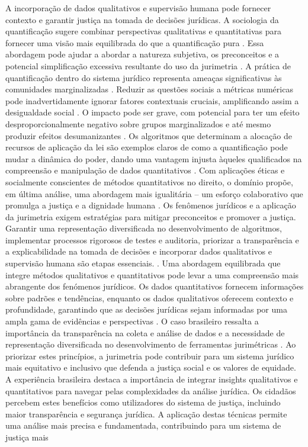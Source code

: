 A incorporação de dados qualitativos e supervisão humana pode fornecer contexto e garantir justiça na tomada de decisões jurídicas. A sociologia da quantificação sugere combinar perspectivas qualitativas e quantitativas para fornecer uma visão mais equilibrada do que a quantificação pura \cite{10.1057/s41599-020-00557-0,10.5040/9781350220645}. Essa abordagem pode ajudar a abordar a natureza subjetiva, os preconceitos e a potencial simplificação excessiva resultante do uso da jurimetria \cite{10.1057/s41599-020-00557-0,10.5040/9781350220645}. A prática de quantificação dentro do sistema jurídico representa ameaças significativas às comunidades marginalizadas \cite{10.1057/s41599-020-00557-0,10.1057/s41599-020-0396-5}. Reduzir as questões sociais a métricas numéricas pode inadvertidamente ignorar fatores contextuais cruciais, amplificando assim a desigualdade social \cite{10.1057/s41599-020-00557-0,10.1057/s41599-020-0396-5}. O impacto pode ser grave, com potencial para ter um efeito desproporcionalmente negativo sobre grupos marginalizados e até mesmo produzir efeitos desumanizantes \cite{10.1057/s41599-020-0396-5,10.1057/s41599-020-00557-0}. Os algoritmos que determinam a alocação de recursos de aplicação da lei são exemplos claros de como a quantificação pode mudar a dinâmica do poder, dando uma vantagem injusta àqueles qualificados na compreensão e manipulação de dados quantitativos \cite{10.1590/dados.2022.65.3.267,1023071190721}. Com aplicações éticas e socialmente conscientes de métodos quantitativos no direito, o domínio propõe, em última análise, uma abordagem mais igualitária – um esforço colaborativo que promulga a justiça e a dignidade humana \cite{10.1007/s11186-021}. Os fenômenos jurídicos e a aplicação da jurimetria exigem estratégias para mitigar preconceitos e promover a justiça. Garantir uma representação diversificada no desenvolvimento de algoritmos, implementar processos rigorosos de testes e auditoria, priorizar a transparência e a explicabilidade na tomada de decisões e incorporar dados qualitativos e supervisão humana são etapas essenciais. . Uma abordagem equilibrada que integre métodos qualitativos e quantitativos pode levar a uma compreensão mais abrangente dos fenómenos jurídicos. Os dados quantitativos fornecem informações sobre padrões e tendências, enquanto os dados qualitativos oferecem contexto e profundidade, garantindo que as decisões jurídicas sejam informadas por uma ampla gama de evidências e perspectivas \cite{unger2021process}. O caso brasileiro ressalta a importância da transparência na coleta e análise de dados e a necessidade de representação diversificada no desenvolvimento de ferramentas jurimétricas \cite{10.1590/dados.2022.65.3.267,10.1007/978-3-319-44000-215}. Ao priorizar estes princípios, a jurimetria pode contribuir para um sistema jurídico mais equitativo e inclusivo que defenda a justiça social e os valores de equidade. A experiência brasileira destaca a importância de integrar insights qualitativos e quantitativos para navegar pelas complexidades da análise jurídica. Os cidadãos percebem estes benefícios como utilizadores do sistema de justiça, incluindo maior transparência e segurança jurídica. A aplicação destas técnicas permite uma análise mais precisa e fundamentada, contribuindo para um sistema de justiça mais 